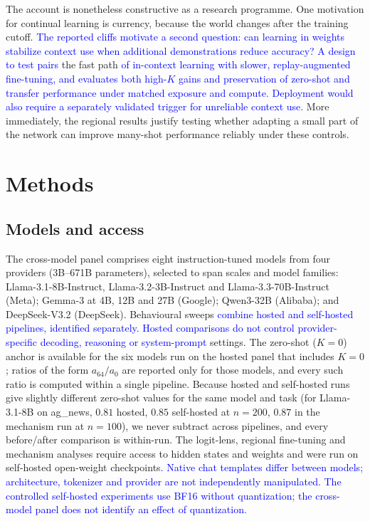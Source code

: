 \documentclass[pdflatex, sn-nature]{sn-jnl}%
\theoremstyle{thmstyleone}%
\theoremstyle{thmstyletwo}%
\theoremstyle{thmstylethree}%
\begin{document}
The account is nonetheless constructive as a research programme. One motivation for
continual learning is currency, because the world changes after the training cutoff.
\textcolor{blue}{The reported cliffs motivate a second question: can learning in weights stabilize
context use when additional demonstrations reduce accuracy? A design to test pairs} the
fast path \textcolor{blue}{of in-context learning with slower, replay-augmented fine-tuning, and
evaluates both high-$K$ gains and preservation of zero-shot and transfer performance
under matched exposure and compute. Deployment would also require a separately
validated trigger for unreliable context use}. More immediately, the regional results
justify testing whether adapting a small part of the network can improve many-shot
performance reliably under these controls.

\section{Methods}\label{sec:methods}

\subsection{Models and access}
The cross-model panel comprises eight instruction-tuned models from four providers
(3B--671B parameters), selected to span scales and model families:
Llama-3.1-8B-Instruct, Llama-3.2-3B-Instruct and Llama-3.3-70B-Instruct (Meta); Gemma-3
at 4B, 12B and 27B (Google); Qwen3-32B (Alibaba); and DeepSeek-V3.2 (DeepSeek).
Behavioural sweeps \textcolor{blue}{combine hosted and self-hosted pipelines, identified separately.
Hosted comparisons do not control provider-specific decoding, reasoning or
system-prompt} settings. The zero-shot ($K{=}0$) anchor is available for the six models
run on the hosted panel that includes $K{=}0$; ratios of the form $a_{64}/a_{0}$ are
reported only for those models, and every such ratio is computed within a single
pipeline. Because hosted and self-hosted runs give slightly different zero-shot values
for the same model and task (for Llama-3.1-8B on ag\_news, $0.81$ hosted, $0.85$
self-hosted at $n{=}200$, $0.87$ in the mechanism run at $n{=}100$), we never subtract
across pipelines, and every before/after comparison is within-run. The logit-lens,
regional fine-tuning and mechanism analyses require access to hidden states and weights
and were run on self-hosted open-weight checkpoints\textcolor{blue}{. Native chat templates differ
between models;
architecture, tokenizer and provider are not independently manipulated. The controlled self-hosted experiments use BF16 without quantization; the
cross-model panel does not identify an effect of quantization.}
\end{document}
